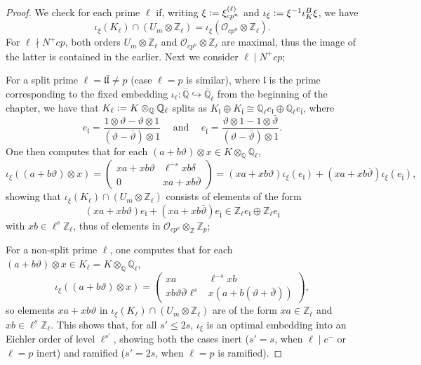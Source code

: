 \documentclass[10pt,a4paper]{amsart}
\newcommand{\Q}{\mathbb{Q}}
\newcommand{\Z}{\mathbb{Z}}
\newcommand{\defeq}{\vcentcolon=}
\begin{document}
\begin{proof}
We check for each prime $\ell$ if, writing $\xi\defeq \xi_{cp^n}^{(\ell)}$ and $\iota_\xi\defeq \xi^{-1}\iota_K^B\xi$, we have \[\iota_\xi(K_\ell)\cap (U_m\otimes\Z_\ell) = \iota_\xi(\mathcal{O}_{cp^n}\otimes \Z_\ell).\]
For $\ell\nmid N^+cp$, both orders $U_m\otimes\Z_\ell$ and $\mathcal{O}_{cp^n}\otimes \Z_\ell$ are maximal, thus the image of the latter is contained in the earlier. Next we consider $\ell\mid N^+cp$;

For a split prime $\ell=\mathfrak{l}\bar{\mathfrak{l}}\neq p$ (case $\ell=p$ is similar), where $\mathfrak{l}$ is the prime corresponding to the fixed embedding $\iota_\ell\colon\overline{\Q}\hookrightarrow\overline{\Q}_\ell$ from the beginning of the chapter, we have that $K_\ell\defeq K\otimes_{\Q}\Q_\ell$ splits as $K_\mathfrak{l}\oplus K_{\bar{\mathfrak{l}}}\cong\Q_\ell e_{\mathfrak{l}}\oplus\Q_\ell e_{\bar{\mathfrak{l}}}$, where \[ e_\mathfrak{l}=\frac{1\otimes\vartheta-\vartheta\otimes1}{(\vartheta-\bar{\vartheta})\otimes 1}\hspace{15pt}\text{and}\hspace{15pt}e_{\bar{\mathfrak{l}}}=\frac{\vartheta\otimes 1-1\otimes\bar{\vartheta}}{(\vartheta-\bar{\vartheta})\otimes1}.\] One then computes that for each $(a+b\vartheta)\otimes x\in K\otimes_\Q\Q_\ell$,
\[\iota_\xi((a+b\vartheta)\otimes x)=\begin{pmatrix}xa+xb\vartheta & \ell^{-s}xb\delta \\ 0 & xa+xb\bar{\vartheta}\end{pmatrix}=(xa+xb\vartheta)\iota_\xi(e_\mathfrak{l})+(xa+xb\bar{\vartheta})\iota_\xi(e_{\bar{\mathfrak{l}}}),\]
showing that $\iota_\xi(K_\ell)\cap (U_m\otimes\Z_\ell)$ consists of elements of the form \[(xa+xb\vartheta)e_\mathfrak{l}+(xa+xb\bar{\vartheta})e_{\bar{\mathfrak{l}}}\in\Z_\ell e_\mathfrak{l}\oplus\Z_\ell e_{\bar{\mathfrak{l}}}\] with $xb\in\ell^s\Z_\ell$, thus of elements in $\mathcal{O}_{cp^n}\otimes_\Z\Z_p$;

For a non-split prime $\ell$, one computes that for each $(a+b\vartheta)\otimes x\in K_\ell=K\otimes_\Q\Q_\ell$, \[\iota_\xi((a+b\vartheta)\otimes x)=\begin{pmatrix}xa & \ell^{-s}xb \\ xb\vartheta\bar{\vartheta}\ell^s & x(a+b(\vartheta+\bar{\vartheta}))\end{pmatrix},\] so elements $xa+xb\vartheta$ in $\iota_\xi(K_\ell)\cap (U_m\otimes\Z_\ell)$ are of the form $xa\in\Z_\ell$ and $xb\in\ell^s\Z_\ell$. This shows that, for all $s'\leq 2s$, $\iota_\xi$ is an optimal embedding into an Eichler order of level $\ell^{s'}$, showing both the cases inert ($s'=s$, when $\ell\mid c^{-}$ or $\ell=p$ inert) and ramified ($s'=2s$, when $\ell=p$ is ramified).\qedhere
\end{proof}
\end{document}
